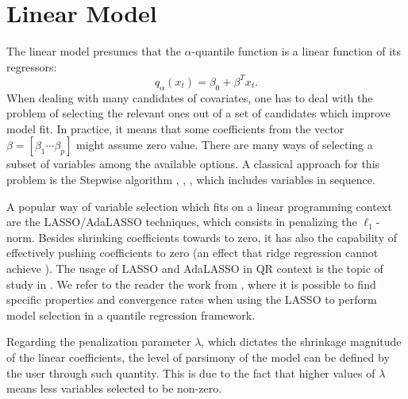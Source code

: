 

\section{Linear Model}

The linear model presumes that the $\alpha$-quantile function is a linear function of its regressors:
$$q_{\alpha}(x_t) = \beta_{0} + \beta^T x_t.$$   
When dealing with many candidates of covariates, one has to deal with the problem of selecting the relevant ones out of a set of candidates which improve model fit. In practice, it means that some coefficients from the vector $\beta = [ \beta_{1 } \cdots \beta_{p} ]$ might assume zero value.
There are many ways of selecting a subset of variables among the available options.
A classical approach for this problem is the Stepwise algorithm \cite{efroymson1960multiple}, \cite{hocking_selection_1967}, \cite{tibshirani1996regression}, which includes variables in sequence. 

A popular way of variable selection which fits on a linear programming context are the LASSO/AdaLASSO techniques, which consists in penalizing the $\ell_1$-norm. Besides shrinking coefficients towards to zero, it has also the capability of effectively pushing coefficients to zero (an effect that ridge regression cannot achieve \cite{tibshirani1996regression}). The usage of LASSO and AdaLASSO in QR context is the topic of study in \cite{li_l1-norm_2008,ciuperca_adaptive_2016,belloni_l1-penalized_2009,zou_regularized_2008,jiang_interquantile_2014}.
We refer to the reader the work from \cite{belloni_l1-penalized_2009}, where it is possible to find specific properties and convergence rates when using the LASSO to perform model selection in a quantile regression framework. 

Regarding the penalization parameter $\lambda$, which dictates the shrinkage magnitude of the linear coefficients, the level of parsimony of the model can be defined by the user through such quantity. This is due to the fact that higher values of $\lambda$ means less variables selected to be non-zero. 

